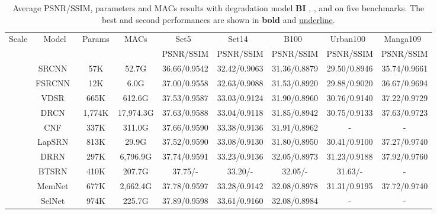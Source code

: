 \documentclass[journal]{IEEEtran}
\begin{document}
\begin{table*}[!ht]
	\centering
	\caption{Average PSNR/SSIM, parameters and MACs results with degradation model \textbf{BI} , , and  on five benchmarks. The best and second performances are shown in \textbf{bold} and \underline{underline}.}
	\label{tab:BI-result}
\begin{tabular}{|c|c|c|c|c|c|c|c|c|}
		\hline
		\multirow{2}{*}{Scale}& \multirow{2}{*}{Model}&  \multirow{2}{*}{Params}& \multirow{2}{*}{MACs}& Set5~\cite{set5}& Set14~\cite{set14}& B100~\cite{b100}& Urban100~\cite{urban100}& Manga109~\cite{manga109} \\
		& & & & PSNR/SSIM & PSNR/SSIM & PSNR/SSIM & PSNR/SSIM & PSNR/SSIM\\
\hline
		\hline
		\multirow{17}{*}{} &SRCNN~\cite{srcnn}&57K &52.7G & 
		36.66/0.9542& 32.42/0.9063& 31.36/0.8879& 29.50/0.8946& 35.74/0.9661\\
		
		& FSRCNN~\cite{fsrcnn}&12K&6.0G& 
		37.00/0.9558& 32.63/0.9088& 31.53/0.8920& 29.88/0.9020& 36.67/0.9694\\
		
		& VDSR~\cite{vdsr}&665K&612.6G& 
		37.53/0.9587& 33.03/0.9124& 31.90/0.8960& 30.76/0.9140& 37.22/0.9729\\
		
		& DRCN~\cite{drcn_ghifary2016deep}&1,774K&17,974.3G& 
		37.63/0.9588& 33.04/0.9118& 31.85/0.8942& 30.75/0.9133& 37.63/0.9723\\
		
		& CNF~\cite{cnf_ren2017image}&337K&311.0G& 
		37.66/0.9590& 33.38/0.9136& 31.91/0.8962& - & - \\
		
		&LapSRN~\cite{lapsrn}&813K&29.9G& 
		37.52/0.9590& 33.08/0.9130& 31.80/0.8950& 30.41/0.9100& 37.27/0.9740\\
		
		&DRRN~\cite{drrn_tai2017image}&297K&6,796.9G& 
		37.74/0.9591& 33.23/0.9136& 32.05/0.8973& 31.23/0.9188& 37.92/0.9760\\
		
		&BTSRN~\cite{btsrn_fan2017balanced}&410K&207.7G& 
		37.75/-& 33.20/-& 32.05/-& 31.63/-& -\\
		
		&MemNet~\cite{memnet}&677K&2,662.4G& 
		37.78/0.9597& 33.28/0.9142& 32.08/0.8978& 31.31/0.9195& 37.72/0.9740 \\
		
		&SelNet~\cite{selnet_choi2017deep}&974K&225.7G& 
		37.89/0.9598& 33.61/0.9160& 32.08/0.8984& - &  - \\
		

\end{tabular}
\end{table*}
\end{document}
